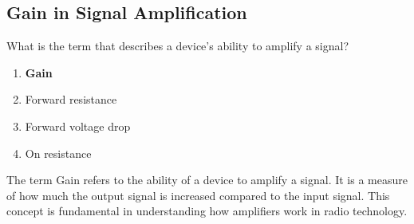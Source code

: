 \subsection{Gain in Signal Amplification}
\label{T6B11}

\begin{tcolorbox}[colback=gray!10!white,colframe=black!75!black,title=T6B11]
What is the term that describes a device's ability to amplify a signal?
\begin{enumerate}[noitemsep]
    \item \textbf{Gain}
    \item Forward resistance
    \item Forward voltage drop
    \item On resistance
\end{enumerate}
\end{tcolorbox}

The term Gain refers to the ability of a device to amplify a signal. It is a measure of how much the output signal is increased compared to the input signal. This concept is fundamental in understanding how amplifiers work in radio technology.